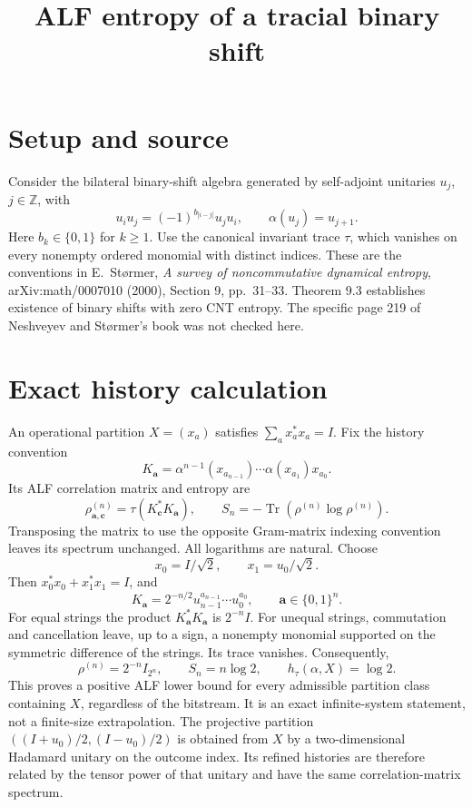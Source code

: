 \documentclass[11pt,a4paper]{article}
\newcommand{\Tr}{\operatorname{Tr}}
\begin{document}
\title{ALF entropy of a tracial binary shift}
\author{}
\date{}
\maketitle
\section*{Setup and source}
Consider the bilateral binary-shift algebra generated by self-adjoint unitaries $u_j$, $j\in\mathbb Z$, with
\[u_iu_j=(-1)^{b_{|i-j|}}u_ju_i,\qquad\alpha(u_j)=u_{j+1}.\]
Here $b_k\in\{0,1\}$ for $k\geq1$. Use the canonical invariant trace $\tau$, which vanishes on every nonempty ordered monomial with distinct indices. These are the conventions in E.~St\o rmer, \emph{A survey of noncommutative dynamical entropy}, arXiv:math/0007010 (2000), Section 9, pp.~31--33. Theorem 9.3 establishes existence of binary shifts with zero CNT entropy. The specific page 219 of Neshveyev and St\o rmer's book was not checked here.

\section*{Exact history calculation}
An operational partition $X=(x_a)$ satisfies $\sum_ax_a^*x_a=I$. Fix the history convention
\[K_{\boldsymbol a}=\alpha^{n-1}(x_{a_{n-1}})\cdots\alpha(x_{a_1})x_{a_0}.\]
Its ALF correlation matrix and entropy are
\[\rho^{(n)}_{\boldsymbol a,\boldsymbol c}=\tau(K_{\boldsymbol c}^*K_{\boldsymbol a}),\qquad S_n=-\Tr(\rho^{(n)}\log\rho^{(n)}).\]
Transposing the matrix to use the opposite Gram-matrix indexing convention leaves its spectrum unchanged. All logarithms are natural. Choose
\[x_0=I/\sqrt2,\qquad x_1=u_0/\sqrt2.\]
Then $x_0^*x_0+x_1^*x_1=I$, and
\[K_{\boldsymbol a}=2^{-n/2}u_{n-1}^{a_{n-1}}\cdots u_0^{a_0},\qquad\boldsymbol a\in\{0,1\}^n.\]
For equal strings the product $K_{\boldsymbol a}^*K_{\boldsymbol a}$ is $2^{-n}I$. For unequal strings, commutation and cancellation leave, up to a sign, a nonempty monomial supported on the symmetric difference of the strings. Its trace vanishes. Consequently,
\[\rho^{(n)}=2^{-n}I_{2^n},\qquad S_n=n\log2,\qquad h_\tau(\alpha,X)=\log2.\]
This proves a positive ALF lower bound for every admissible partition class containing $X$, regardless of the bitstream. It is an exact infinite-system statement, not a finite-size extrapolation. The projective partition $((I+u_0)/2,(I-u_0)/2)$ is obtained from $X$ by a two-dimensional Hadamard unitary on the outcome index. Its refined histories are therefore related by the tensor power of that unitary and have the same correlation-matrix spectrum.
\end{document}
